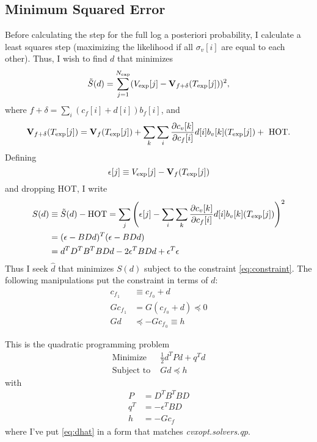 \documentclass[11pt]{article}
\newcommand{\partiald}[2]{\frac{\partial #1}{\partial #2}}
\newcommand\Vt{\mathbf{V}}
\newcommand\vexp{V_{\rm{exp}}}
\newcommand\texp{T_{\rm{exp}}}
\newcommand\cf{c_f}
\newcommand\cv{c_v}
\newcommand\fbasis{b_f}
\newcommand\vbasis{b_v}
\begin{document}
\subsection{Minimum Squared Error}
\label{sec:minsq}

Before calculating the step for the full log a posteriori probability,
I calculate a least squares step (maximizing the likelihood if all
$\sigma_v[i]$ are equal to each other).  Thus, I wish to find $d$ that
minimizes
\begin{equation}
  \label{eq:ssq}
  \tilde S(d) = \sum_{j=1}^{N_{\rm exp}} (\vexp[j] - \Vt_{f+\delta}(\texp[j]))^2,
\end{equation}
where $f+\delta = \sum_i (\cf[i] + d[i])\fbasis[i]$, and 
\begin{equation}
  \label{eq:taylor}
  \Vt_{f+\delta}(\texp[j]) = \Vt_f(\texp[j]) +
  \sum_k \sum_i \partiald{\cv[k]}{\cf[i]}d[i]\vbasis[k](\texp[j])
  +\text{ HOT}.
\end{equation}
Defining
\begin{equation}
  \label{eq:epsilon}
  \epsilon[j] \equiv \vexp[j] - \Vt_f(\texp[j])
\end{equation}
and dropping HOT, I write
\begin{align}
  S(d) &\equiv \tilde S(d) - \text{HOT} = \sum_j \left( \epsilon[j] -
  \sum_i \sum_k \partiald{\cv[k]}{\cf[i]}d[i]\vbasis[k](\texp[j])
  \right)^2 \nonumber \\
  \label{eq:sd}
  &= (\epsilon - BDd)^T(\epsilon - BDd)\\
  &= d^TD^TB^TBDd - 2 \epsilon^TBDd + \epsilon^T\epsilon \nonumber
\end{align}
Thus I seek $\hat d$ that minimizes $S(d)$ subject to the constraint
\eqref{eq:constraint}.  The following manipulations put the constraint
in terms of $d$:
\begin{align*}
  \cf{_{_1}} &\equiv \cf{_{_0}} + d \\
  G \cf{_{_1}} &= G \left( \cf{_{_0}} + d \right) \preceq 0 \\
  G d &\preceq -G \cf{_{_0}} \equiv h
\end{align*}


This is the quadratic programming problem
\begin{subequations}
  \label{eq:dhat}
  \begin{align}
    \text{Minimize } & \frac{1}{2} d^T P d + q^T d \\
    \text{Subject to } & Gd \preceq h
  \end{align}
\end{subequations}
with
\begin{align*}
  P &= D^TB^TBD \\
  q^T &= -\epsilon^TBD \\
  h &= -G\cf
\end{align*}
where I've put \eqref{eq:dhat} in a form that matches
\emph{cvxopt.solvers.qp}.
\end{document}
